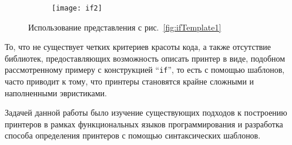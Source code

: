 \begin{figure}[h!]
	\begin{subfigure}[b]{0.60\linewidth}
		\centering
		\texttt{[image: if2]}
		\caption{}
		\label{fig:ifImage2}
	\end{subfigure}
	\hspace{0.5cm}
	\begin{subfigure}[b]{0.30\linewidth}
		\centering
		
		\caption{}
		\label{fig:ifCode2}
	\end{subfigure}

	\caption{Использование представления с рис.~\ref{fig:ifTemplate1}}
\end{figure}

То, что не существует четких критериев красоты кода, а также отсутствие библиотек, предоставляющих возможность описать принтер в виде, подобном
рассмотренному примеру с конструкцией “\lstinline{if}”, то есть с помощью шаблонов, часто приводит к тому, что принтеры становятся крайне сложными и наполненными эвристиками.

Задачей данной работы было изучение существующих подходов к построению принтеров в рамках функциональных языков программирования и разработка способа определения принтеров с помощью синтаксических шаблонов.
